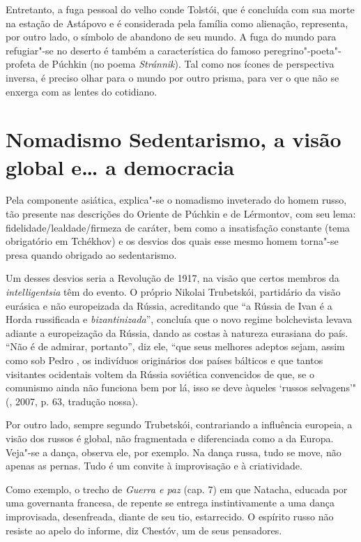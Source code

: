 Entretanto, a fuga pessoal do velho conde Tolstói, que é concluída com sua morte na estação de Astápovo e é considerada pela família como alienação, representa, por outro lado, o símbolo de abandono de seu mundo. A fuga do mundo para refugiar"-se no deserto é também a característica do famoso peregrino"-poeta"-profeta de Púchkin (no poema \emph{Stránnik}). Tal como nos ícones de perspectiva inversa, é preciso olhar para o mundo por outro prisma, para ver o que não se enxerga com as lentes do cotidiano.

\section{\uppercase{N}omadismo {} \uppercase{S}edentarismo, a visão global e\ldots{} a democracia}

Pela componente asiática, explica"-se o nomadismo inveterado do homem russo, tão presente nas descrições do Oriente de Púchkin e de Lérmontov, com seu lema: fidelidade/lealdade/firmeza de caráter, bem como a insatisfação constante (tema obrigatório em Tchékhov) e os desvios dos quais esse mesmo homem torna"-se presa quando obrigado ao sedentarismo.

Um desses desvios seria a Revolução de 1917, na visão que certos membros da \emph{intelligentsia} têm do evento. O próprio Nikolai Trubetskói, partidário da visão eurásica e não europeizada da Rússia, acreditando que ``a Rússia de Ivan  é a Horda russificada e \emph{bizantinizada}'', concluía que o novo regime bolchevista levava adiante a europeização da Rússia, dando as costas à natureza eurasiana do país. ``Não é de admirar, portanto'', diz ele, ``que seus melhores adeptos sejam, assim como sob Pedro , os indivíduos originários dos países bálticos e que tantos visitantes ocidentais voltem da Rússia
soviética convencidos de que, se o comunismo ainda não funciona bem por lá, isso se deve àqueles `russos selvagens'" (, 2007, p. 63, tradução nossa).

Por outro lado, sempre segundo Trubetskói, contrariando a influência europeia, a visão dos russos é global, não fragmentada e diferenciada como a da Europa. Veja"-se a dança, observa ele, por exemplo. Na dança russa, tudo se move, não apenas as pernas. Tudo é um convite à improvisação e à criatividade.

Como exemplo, o trecho de \emph{Guerra e paz} (cap. 7) em que Natacha, educada por uma governanta francesa, de repente se entrega
instintivamente a uma dança improvisada, desenfreada, diante de seu tio, estarrecido. O espírito russo não resiste ao apelo do informe, diz Chestóv, um de seus pensadores.

